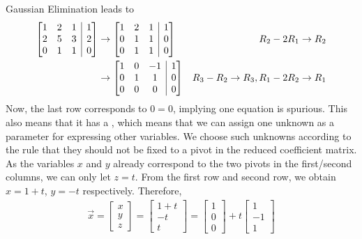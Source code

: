 \begin{solution} 
Gaussian Elimination leads to
\begin{align*}
\left[\begin{array}{@{}ccc|c@{}}
1 & 2 & 1 & 1 \\
2 & 5 & 3 & 2 \\
0 & 1 & 1 & 0
\end{array}\right] 
& \to 
\left[\begin{array}{@{}ccc|c@{}}
1 & 2 & 1 & 1 \\
0 & 1 & 1 & 0 \\
0 & 1 & 1 & 0
\end{array}\right] 
& R_2 - 2R_1 \to R_2 \\
& \to 
\left[\begin{array}{@{}ccc|c@{}}
1 & 0 & -1 & 1 \\
0 & 1 & 1 & 0 \\
0 & 0 & 0 & 0
\end{array}\right] 
& R_3-R_2 \to R_3, R_1-2R_2 \to R_1
\end{align*}
Now, the last row corresponds to $0 = 0$, implying one equation is spurious. This also means that it has a , which means that we can assign one unknown as a parameter for expressing other variables. We choose such unknowns according to the rule that they should not be fixed to a pivot in the reduced coefficient matrix. As the variables $x$ and $y$ already correspond to the two pivots in the first/second columns, we can only let $z = t$. From the first row and second row, we obtain $x = 1+t$, $y = -t$ respectively. Therefore,
\begin{align*}
\vec{x} = 
\begin{bmatrix}
x \\
y \\
z
\end{bmatrix}
=
\begin{bmatrix}
1+t \\
-t \\
t
\end{bmatrix}
=
\begin{bmatrix}
1 \\
0 \\
0
\end{bmatrix}
+ t
\begin{bmatrix}
1 \\
-1 \\
1
\end{bmatrix}
\end{align*}

\end{solution}
